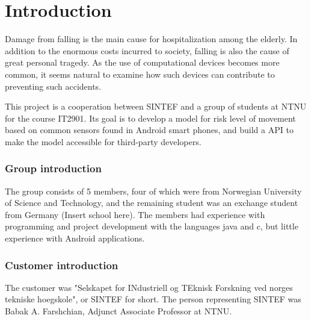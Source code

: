 \chapter{Introduction}


Damage from falling is the main cause for hospitalization among the elderly. In addition to the enormous costs incurred to society, falling is also the cause of great personal tragedy. As the use of computational devices becomes more common, it seems natural to examine how such devices can contribute to preventing such accidents.

This project is a cooperation between SINTEF and a group of students at NTNU for the course IT2901. Its goal is to develop a model for risk level of movement based on common sensors found in Android smart phones, and build a API to make the model accessible for third-party developers.

\subsection{Group introduction}
The group consists of 5 members, four of which were from Norwegian University of Science and Technology, and the remaining student was an exchange student from Germany (Insert school here). The members had experience with programming and project development with the languages java and c$  $, but little experience with Android applications. 

\subsection{Customer introduction}
The customer was "Selskapet for INdustriell og TEknisk Forskning ved norges tekniske hoegskole", or SINTEF for short. The person representing SINTEF was Babak A. Farshchian, Adjunct Associate Professor at NTNU. 